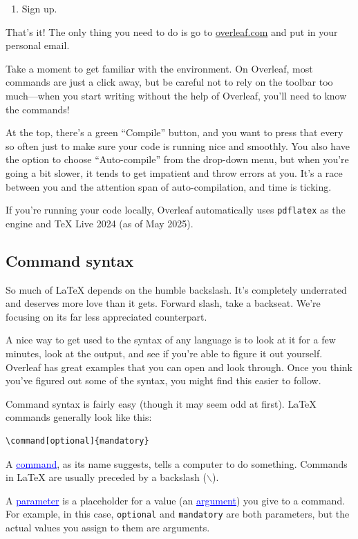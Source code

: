 \documentclass[letterpaper, 12pt]{article}
\newcommand{\define}[1]{\textcolor{blue}{\underline{#1}}} %
\begin{document}
\begin{enumerate}
    \item Sign up.
\end{enumerate}

That's it! The only thing you need to do is go to \href{overleaf.com}{overleaf.com} and put in your personal email.

Take a moment to get familiar with the environment. On Overleaf, most commands are just a click away, but be careful not to rely on the toolbar too much---when you start writing without the help of Overleaf, you'll need to know the commands!

At the top, there's a green ``Compile'' button, and you want to press that every so often just to make sure your code is running nice and smoothly. You also have the option to choose ``Auto-compile'' from the drop-down menu, but when you're going a bit slower, it tends to get impatient and throw errors at you. It's a race between you and the attention span of auto-compilation, and time is ticking.

If you're running your code locally, Overleaf automatically uses \texttt{pdflatex} as the engine and \TeX{} Live 2024 (as of May 2025). 

\subsection{Command syntax}
So much of \LaTeX{} depends on the humble backslash. It's completely underrated and deserves more love than it gets. Forward slash, take a backseat. We're focusing on its far less appreciated counterpart.

A nice way to get used to the syntax of any language is to look at it for a few minutes, look at the output, and see if you're able to figure it out yourself. Overleaf has great examples that you can open and look through. Once you think you've figured out some of the syntax, you might find this easier to follow.

Command syntax is fairly easy (though it may seem odd at first). \LaTeX{} commands generally look like this:

\begin{verbatim}
\command[optional]{mandatory}
\end{verbatim}
A \define{command}, as its name suggests, tells a computer to do something. Commands in \LaTeX{} are usually preceded by a backslash ($\backslash$).

A \define{parameter} is a placeholder for a value (an \define{argument}) you give to a command. For example, in this case, \texttt{optional} and \texttt{mandatory} are both parameters, but the actual values you assign to them are arguments.
\end{document}
